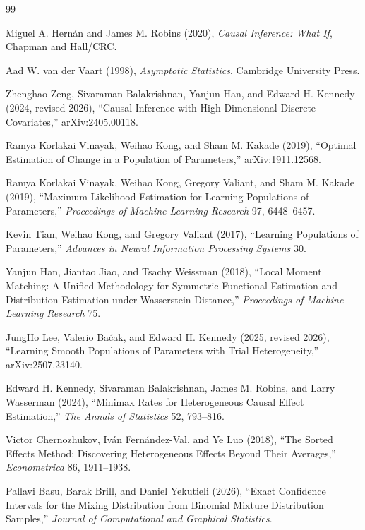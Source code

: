 \documentclass{article}
\begin{document}
\begin{thebibliography}{99}

   Miguel A. Hernán and James M. Robins (2020), \emph{Causal Inference: What If}, Chapman and Hall/CRC.

   Aad W. van der Vaart (1998), \emph{Asymptotic Statistics}, Cambridge University Press.

   Zhenghao Zeng, Sivaraman Balakrishnan, Yanjun Han, and Edward H. Kennedy (2024, revised 2026), ``Causal Inference with High-Dimensional Discrete Covariates,'' arXiv:2405.00118.

   Ramya Korlakai Vinayak, Weihao Kong, and Sham M. Kakade (2019), ``Optimal Estimation of Change in a Population of Parameters,'' arXiv:1911.12568.

   Ramya Korlakai Vinayak, Weihao Kong, Gregory Valiant, and Sham M. Kakade (2019), ``Maximum Likelihood Estimation for Learning Populations of Parameters,'' \emph{Proceedings of Machine Learning Research} 97, 6448--6457.

   Kevin Tian, Weihao Kong, and Gregory Valiant (2017), ``Learning Populations of Parameters,'' \emph{Advances in Neural Information Processing Systems} 30.

   Yanjun Han, Jiantao Jiao, and Tsachy Weissman (2018), ``Local Moment Matching: A Unified Methodology for Symmetric Functional Estimation and Distribution Estimation under Wasserstein Distance,'' \emph{Proceedings of Machine Learning Research} 75.

   JungHo Lee, Valerio Baćak, and Edward H. Kennedy (2025, revised 2026), ``Learning Smooth Populations of Parameters with Trial Heterogeneity,'' arXiv:2507.23140.

   Edward H. Kennedy, Sivaraman Balakrishnan, James M. Robins, and Larry Wasserman (2024), ``Minimax Rates for Heterogeneous Causal Effect Estimation,'' \emph{The Annals of Statistics} 52, 793--816.

   Victor Chernozhukov, Iván Fernández-Val, and Ye Luo (2018), ``The Sorted Effects Method: Discovering Heterogeneous Effects Beyond Their Averages,'' \emph{Econometrica} 86, 1911--1938.

   Pallavi Basu, Barak Brill, and Daniel Yekutieli (2026), ``Exact Confidence Intervals for the Mixing Distribution from Binomial Mixture Distribution Samples,'' \emph{Journal of Computational and Graphical Statistics}.


\end{thebibliography}
\end{document}
